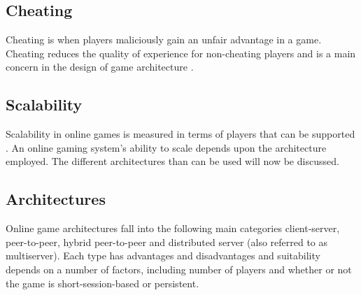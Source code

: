 
\subsection{Cheating}
Cheating is when players maliciously gain an unfair advantage in a game. Cheating reduces the quality of experience for non-cheating players and is a main concern in the design of game architecture \cite{P2PSurvey}. 

\subsection{Scalability}
Scalability in online games is measured in terms of players that can be supported \cite{turchini2015scalability}. An online gaming system's ability to scale depends upon the architecture employed. The different architectures than can be used will now be discussed.



\subsection{Architectures}
Online game architectures fall into the following main categories client-server, peer-to-peer, hybrid peer-to-peer and distributed server (also referred to as multiserver). Each type has advantages and disadvantages and suitability depends on a number of factors, including number of players and whether or not the game is short-session-based or persistent.

